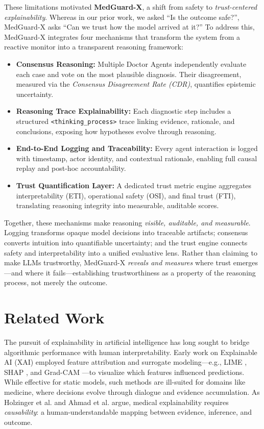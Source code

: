 \documentclass[letterpaper]{article} %
\begin{document}
These limitations motivated \textbf{MedGuard-X}, a shift from safety to \emph{trust-centered explainability}. 
Whereas in our prior work, we asked “Is the outcome safe?”, MedGuard-X asks “Can we trust how the model arrived at it?” 
To address this, MedGuard-X integrates four mechanisms that transform the system from a reactive monitor into a transparent reasoning framework:
\begin{itemize}
    \item \textbf{Consensus Reasoning:} Multiple Doctor Agents independently evaluate each case and vote on the most plausible diagnosis. Their disagreement, measured via the \emph{Consensus Disagreement Rate (CDR)}, quantifies epistemic uncertainty.
    \item \textbf{Reasoning Trace Explainability:} Each diagnostic step includes a structured \texttt{<thinking\_process>} trace linking evidence, rationale, and conclusions, exposing how hypotheses evolve through reasoning.
    \item \textbf{End-to-End Logging and Traceability:} Every agent interaction is logged with timestamp, actor identity, and contextual rationale, enabling full causal replay and post-hoc accountability.
    \item \textbf{Trust Quantification Layer:} A dedicated trust metric engine aggregates interpretability (ETI), operational safety (OSI), and final trust (FTI), translating reasoning integrity into measurable, auditable scores.
\end{itemize}

Together, these mechanisms make reasoning \emph{visible, auditable, and measurable}. 
Logging transforms opaque model decisions into traceable artifacts; consensus converts intuition into quantifiable uncertainty; and the trust engine connects safety and interpretability into a unified evaluative lens. 
Rather than claiming to make LLMs trustworthy, MedGuard-X \emph{reveals and measures} where trust emerges—and where it fails—establishing trustworthiness as a property of the reasoning process, not merely the outcome.


\section{Related Work}

The pursuit of explainability in artificial intelligence has long sought to bridge algorithmic performance with human interpretability. Early work on Explainable AI (XAI) employed feature attribution and surrogate modeling—e.g., LIME \cite{ribeiro2016should}, SHAP \cite{lundberg2017unified}, and Grad-CAM \cite{selvaraju2017grad}—to visualize which features influenced predictions. While effective for static models, such methods are ill-suited for domains like medicine, where decisions evolve through dialogue and evidence accumulation. As Holzinger et al. \cite{holzinger2019causability} and Ahmad et al. \cite{ahmad2018interpretable} argue, medical explainability requires \emph{causability}: a human-understandable mapping between evidence, inference, and outcome.
\end{document}

